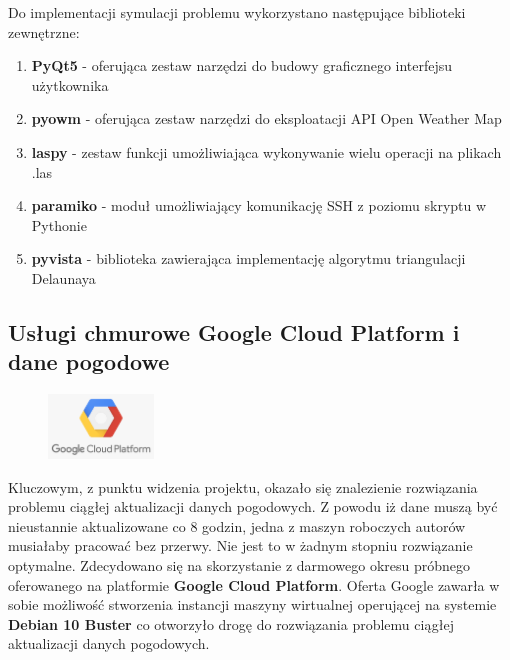 Do implementacji symulacji problemu wykorzystano następujące biblioteki zewnętrzne:

\begin{enumerate}
	\item \textbf{PyQt5} - oferująca zestaw narzędzi do budowy graficznego interfejsu użytkownika
	\item \textbf{pyowm} - oferująca zestaw narzędzi do eksploatacji API Open Weather Map
	\item \textbf{laspy} - zestaw funkcji umożliwiająca wykonywanie wielu operacji na plikach .las
	\item \textbf{paramiko} - moduł umożliwiający komunikację SSH z poziomu skryptu w Pythonie
	\item \textbf{pyvista} - biblioteka zawierająca implementację algorytmu triangulacji Delaunaya
\end{enumerate}

\subsection{Usługi chmurowe Google Cloud Platform i dane pogodowe}
\begingroup
\begin{figure}
	
	\centering
	\includegraphics[width=0.25\textwidth]{gcp_logo.png}
	
\end{figure}
Kluczowym, z punktu widzenia projektu, okazało się znalezienie rozwiązania problemu ciągłej aktualizacji danych pogodowych. Z powodu iż dane muszą być nieustannie aktualizowane co 8 godzin, jedna z maszyn roboczych autorów musiałaby pracować bez przerwy. Nie jest to w żadnym stopniu rozwiązanie optymalne. Zdecydowano się na skorzystanie z darmowego okresu próbnego oferowanego na platformie \textbf{Google Cloud Platform}. Oferta Google zawarła w sobie możliwość stworzenia instancji maszyny wirtualnej operującej na systemie \textbf{Debian 10 Buster} co otworzyło drogę do rozwiązania problemu ciągłej aktualizacji danych pogodowych.
\clearpage

